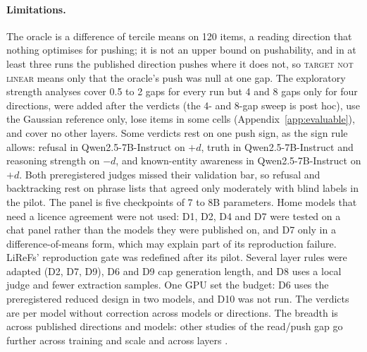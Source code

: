 \documentclass[11pt]{article}
\newcommand{\verdict}[1]{\textsc{\MakeLowercase{#1}}}
\begin{document}
\paragraph{Limitations.} The oracle is a difference of tercile means on 120 items, a reading direction that nothing optimises for pushing; it is not an upper bound on pushability, and in at least three runs the published direction pushes where it does not, so \verdict{TARGET NOT LINEAR} means only that the oracle's push was null at one gap. The exploratory strength analyses cover 0.5 to 2 gaps for every run but 4 and 8 gaps only for four directions, were added after the verdicts (the 4- and 8-gap sweep is post hoc), use the Gaussian reference only, lose items in some cells (Appendix~\ref{app:evaluable}), and cover no other layers. Some verdicts rest on one push sign, as the sign rule allows: refusal in Qwen2.5-7B-Instruct on $+d$, truth in Qwen2.5-7B-Instruct and reasoning strength on $-d$, and known-entity awareness in Qwen2.5-7B-Instruct on $+d$. Both preregistered judges missed their validation bar, so refusal and backtracking rest on phrase lists that agreed only moderately with blind labels in the pilot. The panel is five checkpoints of 7 to 8B parameters. Home models that need a licence agreement were not used: D1, D2, D4 and D7 were tested on a chat panel rather than the models they were published on, and D7 only in a difference-of-means form, which may explain part of its reproduction failure. LiReFs' reproduction gate was redefined after its pilot. Several layer rules were adapted (D2, D7, D9), D6 and D9 cap generation length, and D8 uses a local judge and fewer extraction samples. One GPU set the budget: D6 uses the preregistered reduced design in two models, and D10 was not run. The verdicts are per model without correction across models or directions. The breadth is across published directions and models: other studies of the read/push gap go further across training and scale \citep{xun2026lagged} and across layers \citep{billa2026lap,wang2026readbest}.
\end{document}
